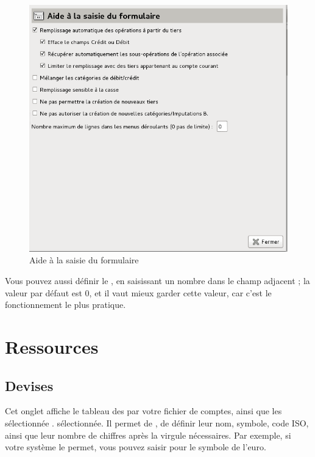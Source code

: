 \ifIllustration
\begin{figure}[ht]
\begin{center}
\includegraphics[scale=0.5]{image/screenshot/setup_enterHelp}
\end{center}
\caption{Aide à la saisie du formulaire}
\label{setup-enterHelp-img}
\end{figure}
\fi

Vous pouvez aussi définir le , en saisissant un nombre dans le champ adjacent ; la valeur par défaut est 0, et il vaut mieux garder cette valeur, car c'est le fonctionnement le plus pratique. 


\section{Ressources\label{setup-resources}}


\subsection{Devises\label{setup-resources-currencies}}

Cet onglet affiche le tableau des  par votre fichier de comptes, ainsi que les  \ifIllustration sélectionnée . 
\else sélectionnée.
\fi
Il permet de , de définir leur nom, symbole, code ISO, ainsi que leur nombre de chiffres après la virgule nécessaires. Par exemple, si votre système le permet, vous pouvez saisir  pour le symbole de l'euro. 

